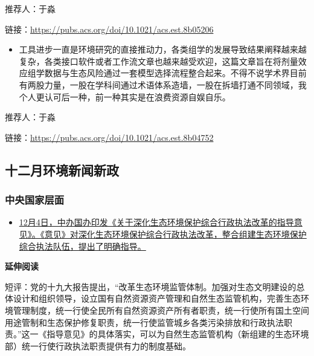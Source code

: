 \documentclass[
]{book}
\providecommand{\tightlist}{%
  \setlength{\itemsep}{0pt}\setlength{\parskip}{0pt}}
\begin{document}
推荐人：于淼

链接：\url{https://pubs.acs.org/doi/10.1021/acs.est.8b05206}

\begin{itemize}
\tightlist
\item
  工具进步一直是环境研究的直接推动力，各类组学的发展导致结果阐释越来越复杂，各类接口软件或者工作流文章也越来越受欢迎，这篇文章旨在将剂量效应组学数据与生态风险通过一套模型选择流程整合起来。不得不说学术界目前有两股力量，一股在学科间通过术语体系造墙，一股在拆墙打通不同领域，我个人更认可后一种，前一种其实是在浪费资源自娱自乐。
\end{itemize}

推荐人：于淼

链接：\url{https://pubs.acs.org/doi/10.1021/acs.est.8b04752}

\hypertarget{ux5341ux4e8cux6708ux73afux5883ux65b0ux95fbux65b0ux653f}{%
\subsection*{十二月环境新闻新政}\label{ux5341ux4e8cux6708ux73afux5883ux65b0ux95fbux65b0ux653f}}

\hypertarget{ux4e2dux592eux56fdux5bb6ux5c42ux9762-1}{%
\subsubsection*{中央国家层面}\label{ux4e2dux592eux56fdux5bb6ux5c42ux9762-1}}

\begin{itemize}
\tightlist
\item
  \href{http://fzb.sz.gov.cn/xxgk/qt/gzdt/201812/t20181219_14925016.htm}{12月4日，中办国办印发《关于深化生态环境保护综合行政执法改革的指导意见》。《意见》对深化生态环境保护综合行政执法改革，整合组建生态环境保护综合执法队伍，提出了明确指导。}
\end{itemize}

\textbf{延伸阅读}

短评：党的十九大报告提出，``改革生态环境监管体制。加强对生态文明建设的总体设计和组织领导，设立国有自然资源资产管理和自然生态监管机构，完善生态环境管理制度，统一行使全民所有自然资源资产所有者职责，统一行使所有国土空间用途管制和生态保护修复职责，统一行使监管城乡各类污染排放和行政执法职责。''这一《指导意见》的具体落实，可以为自然生态监管机构（新组建的生态环境部）统一行使行政执法职责提供有力的制度基础。
\end{document}
